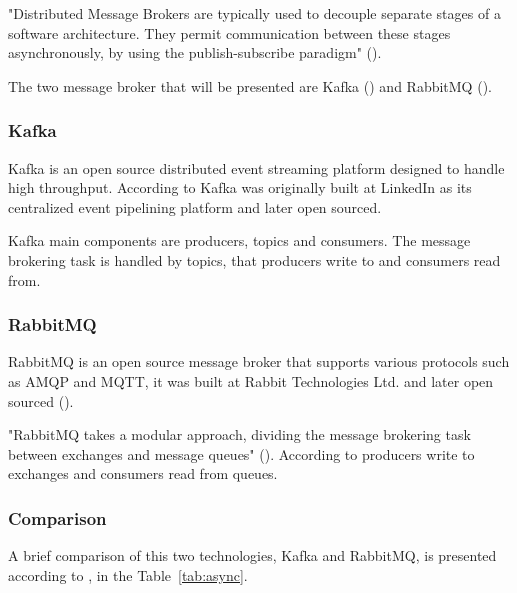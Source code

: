 "Distributed Message Brokers are typically used to decouple separate stages of a software architecture. They permit communication between these stages asynchronously, by using the publish-subscribe paradigm" (\cite{john2017survey}).

The two message broker that will be presented are Kafka (\cite{kafka}) and RabbitMQ (\cite{rabbitmq}).

\subsubsection{Kafka}
\label{subsubsec:stateofart:tech:async:kafka}

Kafka is an open source distributed event streaming platform designed to handle high throughput.
According to \cite{goodhope2012building} Kafka was originally built at LinkedIn as its centralized event pipelining platform and later open sourced.

Kafka main components are producers, topics and consumers. The message brokering task is handled by topics, that producers write to and consumers read from.

\subsubsection{RabbitMQ}
\label{subsubsec:stateofart:tech:async:rabbitmq}

RabbitMQ is an open source message broker that supports various protocols such as \gls{AMQP} and \gls{MQTT}, it was built at Rabbit Technologies Ltd. and later open sourced (\cite{rabbitmq}).

"RabbitMQ takes a modular approach, dividing the message brokering task between exchanges and message queues" (\cite{10.1145/3093742.3093908}).
According to \cite{rabbitmq} producers write to exchanges and consumers read from queues.

\subsubsection{Comparison}
\label{subsubsec:stateofart:tech:async:comp}

A brief comparison of this two technologies, Kafka and RabbitMQ, is presented according to \cite{john2017survey}, \cite{10.1145/3093742.3093908} in the Table~\ref{tab:async}.

